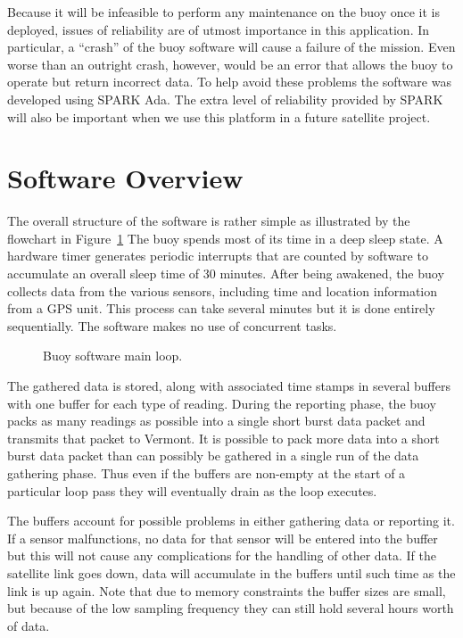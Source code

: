 \documentclass{sig-alternate}
\begin{document}
Because it will be infeasible to perform any maintenance on the buoy once it is deployed, issues
of reliability are of utmost importance in this application. In particular, a ``crash'' of the
buoy software will cause a failure of the mission. Even worse than an outright crash, however,
would be an error that allows the buoy to operate but return incorrect data. To help avoid these
problems the software was developed using SPARK Ada. The extra level of reliability provided by
SPARK will also be important when we use this platform in a future satellite project.

\section{Software Overview}

The overall structure of the software is rather simple as illustrated by the flowchart in
Figure~\ref{fig:main-loop} The buoy spends most of its time in a deep sleep state. A hardware
timer generates periodic interrupts that are counted by software to accumulate an overall sleep
time of 30 minutes. After being awakened, the buoy collects data from the various sensors,
including time and location information from a GPS unit. This process can take several minutes
but it is done entirely sequentially. The software makes no use of concurrent tasks.

\begin{figure}
\centering
\label{fig:main-loop}
\caption{Buoy software main loop.}
\end{figure}

The gathered data is stored, along with associated time stamps in several buffers with one
buffer for each type of reading. During the reporting phase, the buoy packs as many readings as
possible into a single short burst data packet and transmits that packet to Vermont. It is
possible to pack more data into a short burst data packet than can possibly be gathered in a
single run of the data gathering phase. Thus even if the buffers are non-empty at the start of
a particular loop pass they will eventually drain as the loop executes.

The buffers account for possible problems in either gathering data or reporting it. If a sensor
malfunctions, no data for that sensor will be entered into the buffer but this will not cause
any complications for the handling of other data. If the satellite link goes down, data will
accumulate in the buffers until such time as the link is up again. Note that due to memory
constraints the buffer sizes are small, but because of the low sampling frequency they can still
hold several hours worth of data.
\end{document}
